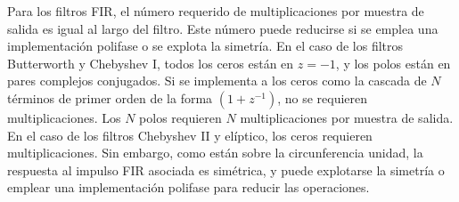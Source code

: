 \documentclass[a4paper]{report}
\begin{document}
Para los filtros FIR, el número requerido de multiplicaciones por muestra de salida es igual al largo del filtro. Este número puede reducirse si se emplea una implementación polifase o se explota la simetría. En el caso de los filtros Butterworth y Chebyshev I, todos los ceros están en \(z=-1\), y los polos están en pares complejos conjugados. Si se implementa a los ceros como la cascada de \(N\) términos de primer orden de la forma \((1+z^{-1})\), no se requieren multiplicaciones. Los \(N\) polos requieren \(N\) multiplicaciones por muestra de salida. En el caso de los filtros Chebyshev II y elíptico, los ceros requieren multiplicaciones. Sin embargo, como están sobre la circunferencia unidad, la respuesta al impulso FIR asociada es simétrica, y puede explotarse la simetría o emplear una implementación polifase para reducir las operaciones.
\end{document}
